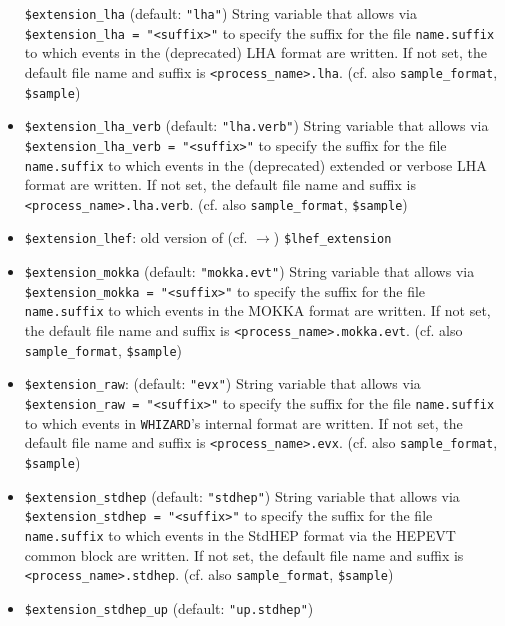 \documentclass[12pt]{book}
\newcommand{\ttt}[1]{\texttt{#1}}
\newcommand{\whizard}{\texttt{WHIZARD}}
\begin{document}
\begin{itemize}
\ttt{\$extension\_lha} \qquad (default: \ttt{"lha"}) \newline
String variable that allows via \ttt{\$extension\_lha = "<suffix>"} to 
specify the suffix for the file \ttt{name.suffix} to which events in
the (deprecated) LHA format are written. If not set, the default file
name and suffix is \ttt{<process\_name>.lha}. (cf. also \ttt{sample\_format},
\ttt{\$sample})  
\item
\ttt{\$extension\_lha\_verb} \qquad (default: \ttt{"lha.verb"}) \newline
String variable that allows via \ttt{\$extension\_lha\_verb = "<suffix>"} to
specify the suffix for the file \ttt{name.suffix} to which events in
the (deprecated) extended or verbose LHA format are written. If not
set, the default file name and suffix is
\ttt{<process\_name>.lha.verb}. (cf. also \ttt{sample\_format},
\ttt{\$sample})  
\item
\ttt{\$extension\_lhef}: old version of (cf. $\to$)
\ttt{\$lhef\_extension}
\item
\ttt{\$extension\_mokka} \qquad (default: \ttt{"mokka.evt"}) \newline
String variable that allows via \ttt{\$extension\_mokka = "<suffix>"} to 
specify the suffix for the file \ttt{name.suffix} to which events in
the MOKKA format are written. If not set, the default file
name and suffix is \ttt{<process\_name>.mokka.evt}. (cf. also \ttt{sample\_format},
\ttt{\$sample})  
\item
\ttt{\$extension\_raw}: \qquad (default: \ttt{"evx"}) \newline
String variable that allows via \ttt{\$extension\_raw = "<suffix>"} to 
specify the suffix for the file \ttt{name.suffix} to which events in
\whizard's internal format are written. If not set, the default file
name and suffix is \ttt{<process\_name>.evx}. (cf. also \ttt{sample\_format},
\ttt{\$sample})  
\item
\ttt{\$extension\_stdhep} \qquad (default: \ttt{"stdhep"}) \newline
String variable that allows via \ttt{\$extension\_stdhep = "<suffix>"} to 
specify the suffix for the file \ttt{name.suffix} to which events in
the StdHEP format via the HEPEVT common block are written. If not set,
the default file name and suffix is
\ttt{<process\_name>.stdhep}. (cf. also \ttt{sample\_format},
\ttt{\$sample})   
\item
\ttt{\$extension\_stdhep\_up} \qquad (default: \ttt{"up.stdhep"}) \newline

\end{itemize}
\end{document}
